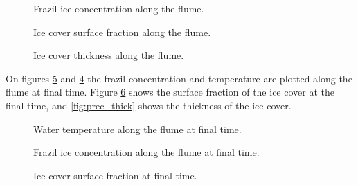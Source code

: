 \begin{figure}[H]
    \begin{center}
    \end{center}
    \caption{Frazil ice concentration along the flume.}
    \label{fig:prec_Cf}
\end{figure}

\begin{figure}[H]
    \begin{center}
    \end{center}
    \caption{Ice cover surface fraction along the flume.}
    \label{fig:prec_Ci}
\end{figure}

\begin{figure}[H]
    \begin{center}
    \end{center}
    \caption{Ice cover thickness along the flume.}
    \label{fig:prec_ti}
\end{figure}

On figures \ref{fig:prec_2d_frazil} and \ref{fig:prec_2d_temperature} the frazil concentration and temperature are plotted along the flume at final time. 
Figure \ref{fig:prec_prec} shows the surface fraction of the ice cover at the final time, and \ref{fig:prec_thick} shows the thickness of the ice cover.

\begin{figure}[H]
    \begin{center}
    \end{center}
    \caption{Water temperature along the flume at final time.}
    \label{fig:prec_2d_temperature}
\end{figure}


\begin{figure}[H]
    \begin{center}
    \end{center}
    \caption{Frazil ice concentration along the flume at final time.}
    \label{fig:prec_2d_frazil}
\end{figure}

\begin{figure}[H]
    \begin{center}
    \end{center}
    \caption{Ice cover surface fraction at final time.}
    \label{fig:prec_prec}
\end{figure}

